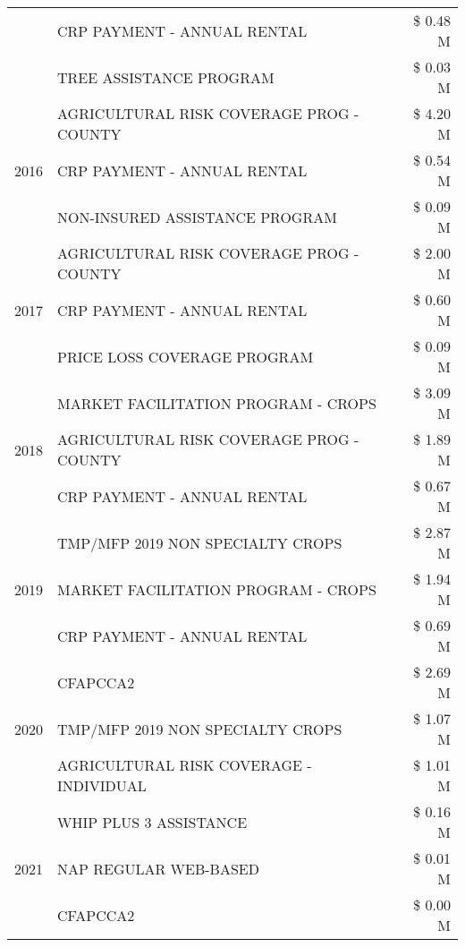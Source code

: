 \begin{tabular}{llr}
 & CRP PAYMENT - ANNUAL RENTAL & \$ 0.48 M \\
 & TREE ASSISTANCE PROGRAM & \$ 0.03 M \\
\cline{1-3}
\multirow[t]{3}{*}{2016} & AGRICULTURAL RISK COVERAGE PROG - COUNTY & \$ 4.20 M \\
 & CRP PAYMENT - ANNUAL RENTAL & \$ 0.54 M \\
 & NON-INSURED ASSISTANCE PROGRAM & \$ 0.09 M \\
\cline{1-3}
\multirow[t]{3}{*}{2017} & AGRICULTURAL RISK COVERAGE PROG - COUNTY & \$ 2.00 M \\
 & CRP PAYMENT - ANNUAL RENTAL & \$ 0.60 M \\
 & PRICE LOSS COVERAGE PROGRAM & \$ 0.09 M \\
\cline{1-3}
\multirow[t]{3}{*}{2018} & MARKET FACILITATION PROGRAM - CROPS & \$ 3.09 M \\
 & AGRICULTURAL RISK COVERAGE PROG - COUNTY & \$ 1.89 M \\
 & CRP PAYMENT - ANNUAL RENTAL & \$ 0.67 M \\
\cline{1-3}
\multirow[t]{3}{*}{2019} & TMP/MFP 2019 NON SPECIALTY CROPS & \$ 2.87 M \\
 & MARKET FACILITATION PROGRAM - CROPS & \$ 1.94 M \\
 & CRP PAYMENT - ANNUAL RENTAL & \$ 0.69 M \\
\cline{1-3}
\multirow[t]{3}{*}{2020} & CFAPCCA2 & \$ 2.69 M \\
 & TMP/MFP 2019 NON SPECIALTY CROPS & \$ 1.07 M \\
 & AGRICULTURAL RISK COVERAGE - INDIVIDUAL & \$ 1.01 M \\
\cline{1-3}
\multirow[t]{3}{*}{2021} & WHIP PLUS 3 ASSISTANCE & \$ 0.16 M \\
 & NAP REGULAR WEB-BASED & \$ 0.01 M \\
 & CFAPCCA2 & \$ 0.00 M \\
\cline{1-3}
\bottomrule
\end{tabular}
